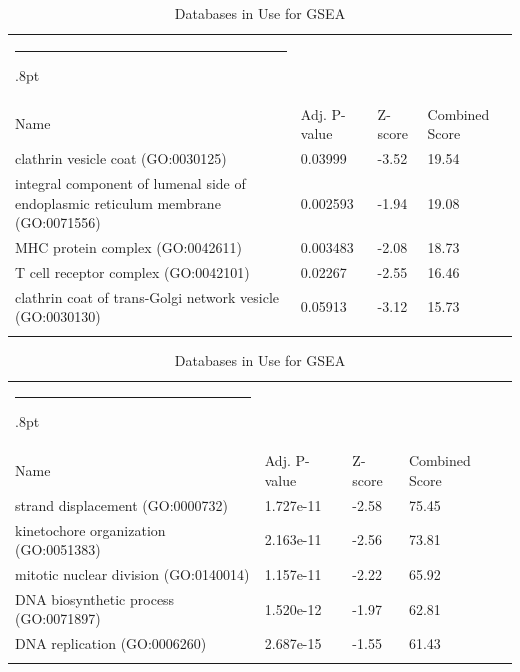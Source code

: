 \documentclass[3p,authoryear,preprint,12pt]{elsarticle}
\makeatletter
\def\hlinewd#1{%
  \noalign{\ifnum0=`}\fi\hrule \@height #1%
  \futurelet\reserved@a\@xhline}
\def\tbltoprule{\hlinewd{.8pt}\\[-12pt]}
\def\tblbottomrule{\noalign{\vspace*{6pt}}\hline\noalign{\vspace*{2pt}}}
\def\tblmidrule{\noalign{\vspace*{6pt}}\hline\noalign{\vspace*{2pt}}}
\makeatother
\begin{document}
\begin{table}[!htbp]
	\caption{{Databases in Use for GSEA} }
	\label{tw-de478ae31cc6}
	\def\arraystretch{1}
	\ignorespaces 
	\centering 
	\begin{tabulary}{\linewidth}{p{\dimexpr.65\tabcolsep}p{\dimexpr.15\tabcolsep}p{\dimexpr.1\tabcolsep}p{\dimexpr.1\tabcolsep}}
		\tbltoprule Name & Adj. P-value & Z-score & Combined Score\\
		\tblmidrule
clathrin vesicle coat (GO:0030125) & 0.03999 & -3.52 & 19.54 \\
integral component of lumenal side of endoplasmic reticulum membrane (GO:0071556) & 0.002593 & -1.94 & 19.08 \\
MHC protein complex (GO:0042611) & 0.003483 & -2.08 & 18.73 \\
T cell receptor complex (GO:0042101) & 0.02267 & -2.55 & 16.46 \\
clathrin coat of trans-Golgi network vesicle (GO:0030130) & 0.05913 & -3.12 & 15.73 \\
		\tblbottomrule
	\end{tabulary}\par 
\end{table}
\begin{table}[!htbp]
	\caption{{Databases in Use for GSEA} }
	\label{tw-de478ae31cc6}
	\def\arraystretch{1}
	\ignorespaces 
	\centering 
	\begin{tabulary}{\linewidth}{p{\dimexpr.65\tabcolsep}p{\dimexpr.15\tabcolsep}p{\dimexpr.1\tabcolsep}p{\dimexpr.1\tabcolsep}}
		\tbltoprule Name & Adj. P-value & Z-score & Combined Score\\
		\tblmidrule
strand displacement (GO:0000732) & 1.727e-11 & -2.58 & 75.45 \\
kinetochore organization (GO:0051383) & 2.163e-11 & -2.56 & 73.81 \\
mitotic nuclear division (GO:0140014) & 1.157e-11 & -2.22 & 65.92 \\
DNA biosynthetic process (GO:0071897) & 1.520e-12 & -1.97 & 62.81 \\
DNA replication (GO:0006260) & 2.687e-15 & -1.55 & 61.43 \\
		\tblbottomrule
	\end{tabulary}\par 
\end{table}
\end{document}
